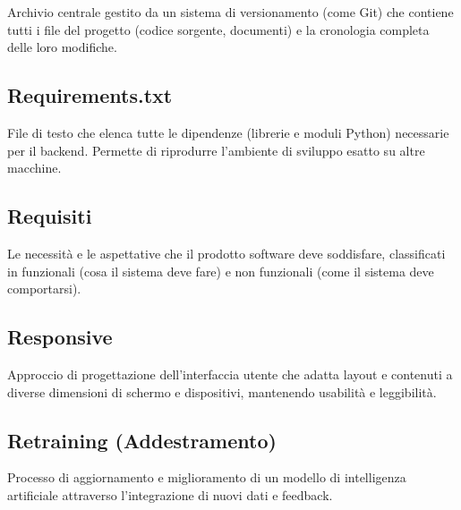 \documentclass[a4paper, 11pt, oneside]{scrartcl} %
\begin{document}

Archivio centrale gestito da un sistema di versionamento (come Git) che contiene tutti i file del progetto (codice sorgente, documenti) e la cronologia completa delle loro modifiche.

\vspace{0.5cm}

\subsection*{Requirements.txt}


File di testo che elenca tutte le dipendenze (librerie e moduli Python) necessarie per il backend. Permette di riprodurre l'ambiente di sviluppo esatto su altre macchine.

\vspace{0.5cm}

\subsection*{Requisiti}


Le necessità e le aspettative che il prodotto software deve soddisfare, classificati in funzionali (cosa il sistema deve fare) e non funzionali (come il sistema deve comportarsi).

\vspace{0.5cm}

\subsection*{Responsive}
Approccio di progettazione dell'interfaccia utente che adatta layout e contenuti a diverse dimensioni di schermo e dispositivi, mantenendo usabilità e leggibilità.
\vspace{0.5cm}

\subsection*{Retraining (Addestramento)}
Processo di aggiornamento e miglioramento di un modello di intelligenza artificiale attraverso l'integrazione di nuovi dati e feedback.
\vspace{0.5cm}
\end{document}
